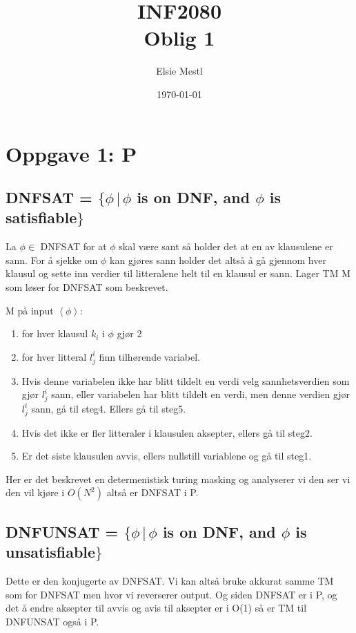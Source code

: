 \documentclass{article}
\title{INF2080\\Oblig 1}
\date{\today}
\author{Elsie Mestl}
\begin{document}
\maketitle



\section{Oppgave 1: P}
\subsection{DNFSAT = $\{\phi \, |  \, \phi $ is on DNF, and $\phi$ is satisfiable$\}$}

La $\phi \in$ DNFSAT for at $\phi$ skal være sant så holder det at en av klausulene er sann. For å sjekke om $\phi$ kan gjøres sann holder det altså å gå gjennom hver klausul og sette inn verdier til litteralene helt til en klausul er sann. Lager TM M som løser for DNFSAT som beskrevet.

M på input $\left<\phi\right>$:
\begin{enumerate}
\item for hver klausul $k_i$ i $\phi$ gjør 2
\item for hver litteral $l_j^i$ finn tilhørende variabel.
\item Hvis denne variabelen ikke har blitt tildelt en verdi velg sannhetsverdien som gjør  $l_j^i$ sann, eller variabelen har blitt tildelt en verdi, men denne verdien gjør $l_j^i$ sann, gå til steg4. Ellers gå til steg5.
\item Hvis det ikke er fler litteraler i klausulen aksepter, ellers gå til steg2.
\item Er det siste klausulen avvis, ellers nullstill variablene og gå til steg1. 
\end{enumerate}

Her er det beskrevet en determenistisk turing masking og analyserer vi den ser vi den vil kjøre i $O(N^2)$ altså er DNFSAT i P. 




\subsection{DNFUNSAT = $\{\phi \, |  \, \phi $ is on DNF, and $\phi$ is unsatisfiable$\}$}

Dette er den konjugerte av DNFSAT. Vi kan altså bruke akkurat samme TM som for DNFSAT men hvor vi reverserer output. Og siden DNFSAT er i P, og det å endre aksepter til avvis og avis til aksepter er i O(1) så er TM til DNFUNSAT også i P.
\end{document}
